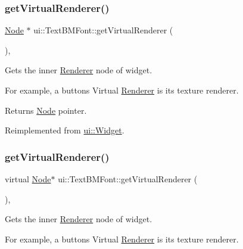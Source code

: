 \subsubsection{\texorpdfstring{get\+Virtual\+Renderer()}{getVirtualRenderer()}\hspace{0.1cm}{\footnotesize\ttfamily [1/2]}}
{\footnotesize\ttfamily \hyperlink{classNode}{Node} $\ast$ ui\+::\+Text\+B\+M\+Font\+::get\+Virtual\+Renderer (\begin{DoxyParamCaption}{ }\end{DoxyParamCaption})\hspace{0.3cm}{\ttfamily [override]}, {\ttfamily [virtual]}}

Gets the inner \hyperlink{classRenderer}{Renderer} node of widget.

For example, a button\textquotesingle{}s Virtual \hyperlink{classRenderer}{Renderer} is it\textquotesingle{}s texture renderer.

\begin{DoxyReturn}{Returns}
\hyperlink{classNode}{Node} pointer. 
\end{DoxyReturn}


Reimplemented from \hyperlink{classui_1_1Widget_acf862bf9235fbb3823819eeb65d46f25}{ui\+::\+Widget}.

\mbox{\label{classui_1_1TextBMFont_a7a78528934f644fac429d3107e8b2f94}} 
\subsubsection{\texorpdfstring{get\+Virtual\+Renderer()}{getVirtualRenderer()}\hspace{0.1cm}{\footnotesize\ttfamily [2/2]}}
{\footnotesize\ttfamily virtual \hyperlink{classNode}{Node}$\ast$ ui\+::\+Text\+B\+M\+Font\+::get\+Virtual\+Renderer (\begin{DoxyParamCaption}{ }\end{DoxyParamCaption})\hspace{0.3cm}{\ttfamily [override]}, {\ttfamily [virtual]}}

Gets the inner \hyperlink{classRenderer}{Renderer} node of widget.

For example, a button\textquotesingle{}s Virtual \hyperlink{classRenderer}{Renderer} is it\textquotesingle{}s texture renderer.

